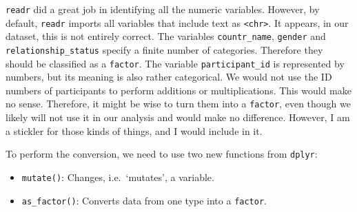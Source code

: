 \documentclass[
]{book}
\newenvironment{Shaded}{\begin{snugshade}}{\end{snugshade}}
\newcommand{\DocumentationTok}[1]{\textcolor[rgb]{0.56,0.35,0.01}{\textbf{\textit{#1}}}}
\newcommand{\FunctionTok}[1]{\textcolor[rgb]{0.00,0.00,0.00}{#1}}
\newcommand{\NormalTok}[1]{#1}
\begin{document}
\begin{Shaded}
\end{Shaded}

\texttt{readr} did a great job in identifying all the numeric variables. However, by default, \texttt{readr} imports all variables that include text as \texttt{\textless{}chr\textgreater{}}. It appears, in our dataset, this is not entirely correct. The variables \texttt{countr\_name}, \texttt{gender} and \texttt{relationship\_status} specify a finite number of categories. Therefore they should be classified as a \texttt{factor}. The variable \texttt{participant\_id} is represented by numbers, but its meaning is also rather categorical. We would not use the ID numbers of participants to perform additions or multiplications. This would make no sense. Therefore, it might be wise to turn them into a \texttt{factor}, even though we likely will not use it in our analysis and would make no difference. However, I am a stickler for those kinds of things, and I would include in it.

To perform the conversion, we need to use two new functions from \texttt{dplyr}:

\begin{itemize}
\item
  \texttt{mutate()}: Changes, i.e.~`mutates', a variable.
\item
  \texttt{as\_factor()}: Converts data from one type into a \texttt{factor}.
\end{itemize}
\end{document}
